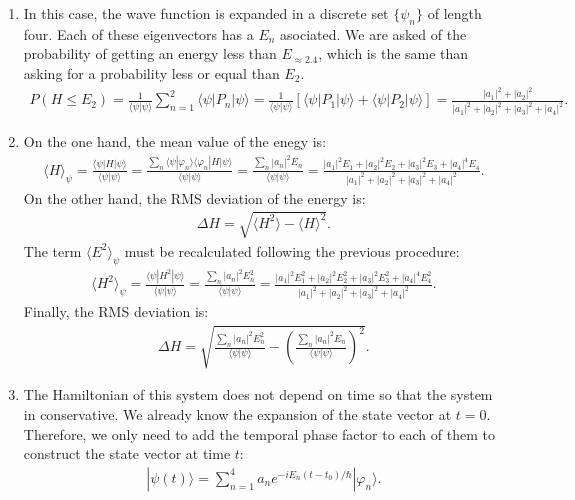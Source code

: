 \documentclass[letterpaper,11pt,twoside]{article}
\newcommand{\ket}[1]{|#1\rangle}
\newcommand{\braket}[1]{\langle#1\rangle}
\begin{document}
\begin{enumerate}[itemsep=0pt,topsep=0pt,label=\alph*.]
  \item In this case, the wave function is expanded in a discrete set $\{\psi_n\}$ of length four. Each of these eigenvectors has a $E_n$
  asociated. We are asked of the probability of getting an energy less than $E_{\approx2.4}$, which is the same than asking for a probability 
  less or equal than $E_2$.
  \begin{align*}
    P(H\leq E_2)=\frac{1}{\braket{\psi|\psi}}\sum_{n=1}^2\braket{\psi|P_n|\psi}=\frac{1}{\braket{\psi|\psi}}\left[\braket{\psi|P_1|\psi}+\braket{\psi|P_2|\psi}\right]=\frac{|a_1|^2+|a_2|^2}{|a_1|^2+|a_2|^2+|a_3|^2+|a_4|^2}.
  \end{align*}
  \item On the one hand, the mean value of the enegy is:
  \begin{align*}
    \braket{H}_\psi=\frac{\braket{\psi|H|\psi}}{\braket{\psi|\psi}}=\frac{\sum_n\braket{\psi|\varphi_n}\braket{\varphi_n|H|\psi}}{\braket{\psi|\psi}}=\frac{\sum_n|a_n|^2E_n}{\braket{\psi|\psi}}=\frac{|a_1|^2E_1+|a_2|^2E_2+|a_3|^2E_3+|a_4|^4E_4}{|a_1|^2+|a_2|^2+|a_3|^2+|a_4|^2}.
  \end{align*}
  On the other hand, the RMS deviation of the energy is:
  \begin{align*}
    \Delta H=\sqrt{\braket{H^2}-\braket{H}^2}.
  \end{align*}
  The term $\braket{E^2}_\psi$ must be recalculated following the previous procedure:
  \begin{align*}
    \braket{H^2}_\psi=\frac{\braket{\psi|H^2|\psi}}{\braket{\psi|\psi}}=\frac{\sum_n|a_n|^2E^2_n}{\braket{\psi|\psi}}=\frac{|a_1|^2E^2_1+|a_2|^2E^2_2+|a_3|^2E^2_3+|a_4|^4E^2_4}{|a_1|^2+|a_2|^2+|a_3|^2+|a_4|^2}.
  \end{align*}
  Finally, the RMS deviation is:
  \begin{align*}
    \Delta H=\sqrt{\frac{\sum_n|a_n|^2E^2_n}{\braket{\psi|\psi}}-\left(\frac{\sum_n|a_n|^2E_n}{\braket{\psi|\psi}}\right)^2}.
  \end{align*}
  \item The Hamiltonian of this system does not depend on time so that the system in conservative. We already know the expansion of the state vector at $t=0$. Therefore, we only need to add the temporal phase
  factor to each of them to construct the state vector at time $t$:
  \begin{align*}
    \ket{\psi(t)}=\sum_{n=1}^4a_ne^{-iE_n(t-t_0)/\hbar}\ket{\varphi_n}.

\end{align*}
\end{enumerate}
\end{document}
